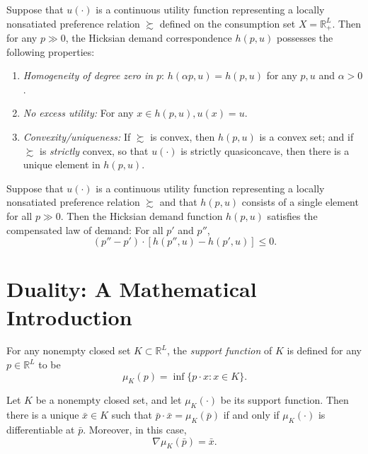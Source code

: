 \begin{prop}
    Suppose that $u(\cdot)$ is a continuous utility function representing a locally nonsatiated preference relation $\succsim$ defined on the consumption set $X = \mathbb{R}^L_+$. Then for any $p \gg 0$, the Hicksian demand correspondence $h(p, u)$ possesses the following properties:
    \begin{enumerate}
        \item \emph{Homogeneity of degree zero in $p$}: $h(\alpha p, u) = h(p, u)$ for any $p, u$ and $\alpha > 0$.
        \item \emph{No excess utility:} For any $x \in h(p, u), u(x) = u$.
        \item \emph{Convexity/uniqueness:} If $\succsim$ is convex, then $h(p, u)$ is a convex set; and if $\succsim$ is \emph{strictly} convex, so that $u(\cdot)$ is strictly quasiconcave, then there is a unique element in $h(p, u)$.
    \end{enumerate}
\end{prop}

\begin{prop}
    Suppose that $u(\cdot)$ is a continuous utility function representing a locally nonsatiated preference relation $\succsim$ and that $h(p, u)$ consists of a single element for all $p \gg 0$. Then the Hicksian demand function $h(p, u)$ satisfies the compensated law of demand: For all $p'$ and $p''$,
    \begin{equation*}
        (p'' - p') \cdot [h(p'', u) - h(p', u)] \leq 0.
    \end{equation*}
\end{prop}


\section{Duality: A Mathematical Introduction}

\begin{defn}
    For any nonempty closed set $K \subset \mathbb{R}^L$, the \emph{support function} of $K$ is defined for any $p \in \mathbb{R}^L$ to be 
    \begin{equation*}
        \mu_K(p) = \inf\{p \cdot x: x \in K\}.
    \end{equation*}
\end{defn}

\begin{prop}
    Let $K$ be a nonempty closed set, and let $\mu_K(\cdot)$ be its support function. Then there is a unique $\bar{x} \in K$ such that $\bar{p} \cdot \bar{x} = \mu_K(\bar{p})$ if and only if $\mu_K(\cdot)$ is differentiable at $\bar{p}$. Moreover, in this case,
    \begin{equation*}
        \nabla \mu_K(\bar{p}) = \bar{x}.
    \end{equation*}
\end{prop}


